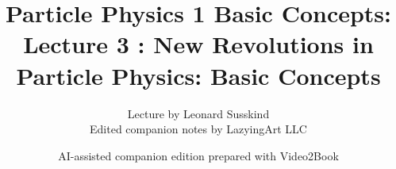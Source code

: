 \documentclass[11pt,oneside]{book}
\begin{document}
\frontmatter
\title{Particle Physics 1 Basic Concepts: Lecture 3 : New Revolutions in Particle Physics: Basic Concepts}
\author{Lecture by Leonard Susskind\\Edited companion notes by LazyingArt LLC}
\date{AI-assisted companion edition prepared with Video2Book}
\maketitle
\clearpage
\mainmatter

\end{document}
